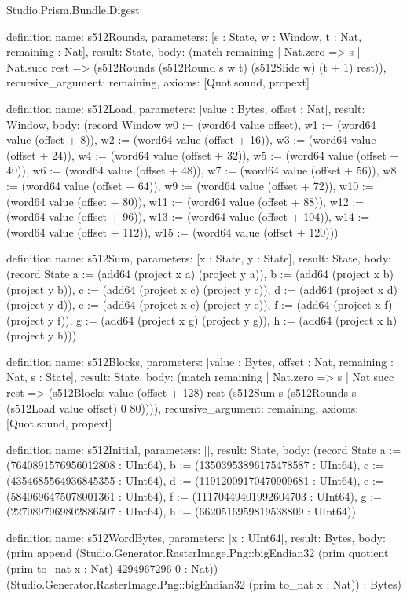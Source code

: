 \begin{lexlean}{Studio.Prism.Bundle.Digest}
\begin{semanticmodule}
definition{
  name: s512Rounds,
  parameters: [s : State, w : Window, t : Nat, remaining : Nat],
  result: State,
  body: (match remaining
    | Nat.zero => s
    | Nat.succ rest => (s512Rounds (s512Round s w t) (s512Slide w) (t + 1) rest)),
  recursive_argument: remaining,
  axioms: [Quot.sound, propext]
}

definition{
  name: s512Load,
  parameters: [value : Bytes, offset : Nat],
  result: Window,
  body: (record Window {w0 := (word64 value offset), w1 := (word64 value (offset + 8)), w2 := (word64 value (offset + 16)), w3 := (word64 value (offset + 24)), w4 := (word64 value (offset + 32)), w5 := (word64 value (offset + 40)), w6 := (word64 value (offset + 48)), w7 := (word64 value (offset + 56)), w8 := (word64 value (offset + 64)), w9 := (word64 value (offset + 72)), w10 := (word64 value (offset + 80)), w11 := (word64 value (offset + 88)), w12 := (word64 value (offset + 96)), w13 := (word64 value (offset + 104)), w14 := (word64 value (offset + 112)), w15 := (word64 value (offset + 120))})
}

definition{
  name: s512Sum,
  parameters: [x : State, y : State],
  result: State,
  body: (record State {a := (add64 (project x a) (project y a)), b := (add64 (project x b) (project y b)), c := (add64 (project x c) (project y c)), d := (add64 (project x d) (project y d)), e := (add64 (project x e) (project y e)), f := (add64 (project x f) (project y f)), g := (add64 (project x g) (project y g)), h := (add64 (project x h) (project y h))})
}

definition{
  name: s512Blocks,
  parameters: [value : Bytes, offset : Nat, remaining : Nat, s : State],
  result: State,
  body: (match remaining
    | Nat.zero => s
    | Nat.succ rest => (s512Blocks value (offset + 128) rest (s512Sum s (s512Rounds s (s512Load value offset) 0 80)))),
  recursive_argument: remaining,
  axioms: [Quot.sound, propext]
}

definition{
  name: s512Initial,
  parameters: [],
  result: State,
  body: (record State {a := (7640891576956012808 : UInt64), b := (13503953896175478587 : UInt64), c := (4354685564936845355 : UInt64), d := (11912009170470909681 : UInt64), e := (5840696475078001361 : UInt64), f := (11170449401992604703 : UInt64), g := (2270897969802886507 : UInt64), h := (6620516959819538809 : UInt64)})
}

definition{
  name: s512WordBytes,
  parameters: [x : UInt64],
  result: Bytes,
  body: (prim append (Studio.Generator.RasterImage.Png::bigEndian32 (prim quotient (prim to_nat x : Nat) 4294967296 0 : Nat)) (Studio.Generator.RasterImage.Png::bigEndian32 (prim to_nat x : Nat)) : Bytes)
}


\end{semanticmodule}
\end{lexlean}
